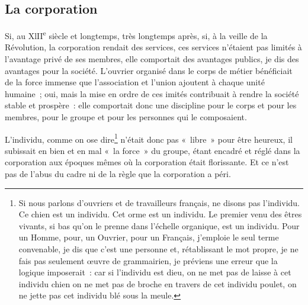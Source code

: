 \documentclass[french,twoside]{book} %
\begin{document}
\subsection[{La corporation}]{La corporation}
\noindent Si, au XlII\textsuperscript{e} siècle et longtemps, très longtemps après, si, à la veille de la Révolution, la corporation rendait des services, ces services n’étaient pas limités à l’avantage privé de ses membres, elle comportait des avantages publics, je dis des avantages pour la société. L’ouvrier organisé dans le corps de métier bénéficiait de la force immense que l’association et l’union ajoutent à chaque unité humaine ; oui, mais la mise en ordre de ces imités contribuait à rendre la société stable et prospère : elle comportait donc une discipline pour le corps et pour les membres, pour le groupe et pour les personnes qui le composaient.\par
L’individu, comme on ose dire\footnote{Si nous parlons d’ouvriers et de travailleurs français, ne disons pas l’individu. Ce chien est un individu. Cet orme est un individu. Le premier venu des êtres vivants, si bas qu’on le prenne dans l’échelle organique, est un individu. Pour un Homme, pour, un Ouvrier, pour un Français, j’emploie le seul terme convenable, je dis que c’est une personne et, rétablissant le mot propre, je ne fais pas seulement œuvre de grammairien, je préviens une erreur que la logique imposerait : car si l’individu est dieu, on ne met pas de laisse à cet individu chien on ne met pas de broche en travers de cet individu poulet, on ne jette pas cet individu blé sous la meule.} n’était donc pas « libre » pour être heureux, il subissait en bien et en mal « la force » du groupe, étant encadré et réglé dans la corporation aux époques mêmes où la corporation était florissante. Et ce n’est pas de l’abus du cadre ni de la règle que la corporation a péri.\par
\end{document}
